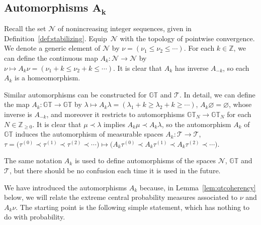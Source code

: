 \documentclass[pdftex]{sigma}
\numberwithin{equation}{section}
\newcommand{\Z}{\mathbb{Z}}
\newcommand{\Nu}{\mathcal{N}}
\newcommand{\GT}{\mathbb{GT}}
\newcommand{\Tau}{\mathcal{T}}
\begin{document}
\subsection[Automorphisms $A_k$]{Automorphisms $\boldsymbol{A_k}$}\label{sec:automorphismsAk}

Recall the set $\Nu$ of nonincreasing integer sequences, given in Def\/inition~\ref{def:stabilizing}. Equip~$\Nu$ with the topology of pointwise convergence. We denote a generic element of $\Nu$ by $\nu = (\nu_1 \leq \nu_2 \leq \cdots)$. For each $k\in\Z$, we can def\/ine the continuous map $A_k\colon \Nu \rightarrow \Nu$ by $\nu \mapsto A_k\nu = (\nu_1 + k \leq \nu_2 + k \leq \cdots)$. It is clear that $A_k$ has inverse $A_{-k}$, so each $A_k$ is a homeomorphism.

Similar automorphisms can be constructed for $\GT$ and $\Tau$. In detail, we can def\/ine the map $A_k\colon \GT \rightarrow \GT$ by $\lambda\mapsto A_k\lambda = (\lambda_1 + k \geq \lambda_2 + k\geq \cdots)$, $A_k\varnothing = \varnothing$, whose inverse is $A_{-k}$, and moreover it restricts to automorphisms $\GT_N \rightarrow \GT_N$ for each $N\in\Z_{\geq 0}$. It is clear that $\mu\prec\lambda$ implies $A_k\mu\prec A_k\lambda$, so the automorphism $A_k$ of $\GT$ induces the automorphism of measurable spaces $A_k\colon \Tau \rightarrow \Tau$, $\tau = \big(\tau^{(0)} \prec \tau^{(1)}\prec \tau^{(2)} \prec \cdots\big)\mapsto \big(A_k\tau^{(0)}\prec A_k\tau^{(1)}\prec A_k\tau^{(2)}\prec\cdots\big)$.

The same notation $A_k$ is used to def\/ine automorphisms of the spaces $\Nu$, $\GT$ and $\Tau$, but there should be no confusion each time it is used in the future.

We have introduced the automorphisms $A_k$ because, in Lemma~\ref{lem:qtcoherency} below, we will relate the extreme central probability measures associated to $\nu$ and $A_k\nu$.
The starting point is the following simple statement, which has nothing to do with probability.
\end{document}
